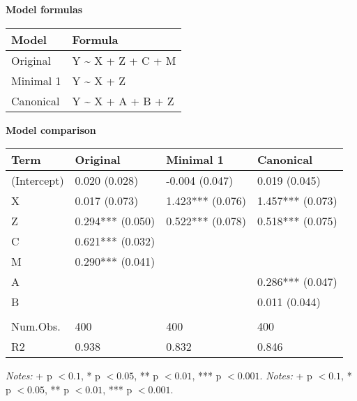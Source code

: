 \noindent\textbf{Model formulas}
\begin{center}
\setlength{\LTleft}{0pt}\setlength{\LTright}{0pt}
\begin{longtable}{@{}l p{}@{}}
\toprule
Model & Formula \\
\midrule
{Original} & {Y \textasciitilde{} X + Z + C + M} \\
{Minimal 1} & {Y \textasciitilde{} X + Z} \\
{Canonical} & {Y \textasciitilde{} X + A + B + Z} \\
\bottomrule
\end{longtable}
\end{center}
\noindent\textbf{Model comparison}
\begin{center}
\setlength{\LTleft}{0pt}\setlength{\LTright}{0pt}
\begin{longtable}{@{}l l l l@{}}
\toprule
Term & Original & Minimal 1 & Canonical \\
\midrule
{\textnormal{(Intercept)}} & {0.020 (0.028)} & {-0.004 (0.047)} & {0.019 (0.045)} \\
{\textnormal{X}} & {0.017 (0.073)} & {1.423*** (0.076)} & {1.457*** (0.073)} \\
{\textnormal{Z}} & {0.294*** (0.050)} & {0.522*** (0.078)} & {0.518*** (0.075)} \\
{\textnormal{C}} & {0.621*** (0.032)} &  &  \\
{\textnormal{M}} & {0.290*** (0.041)} &  &  \\
{\textnormal{A}} &  &  & {0.286*** (0.047)} \\
{\textnormal{B}} &  &  & {0.011 (0.044)} \\
 &  &  &  \\
{\textnormal{Num.Obs.}} & {400} & {400} & {400} \\
{\textnormal{R2}} & {0.938} & {0.832} & {0.846} \\
\bottomrule
\end{longtable}
\end{center}
{\footnotesize \emph{Notes:} + p $< 0.1$, * p $< 0.05$, ** p $< 0.01$, *** p $< 0.001$.}
{\footnotesize \emph{Notes:} + p $< 0.1$, * p $< 0.05$, ** p $< 0.01$, *** p $< 0.001$.}
\endgroup
